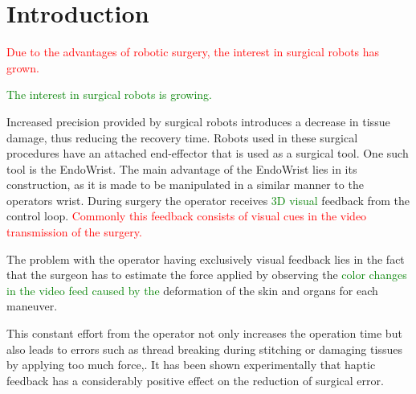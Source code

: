 \section{Introduction}\label{sec:introduction}
{}
\textcolor{red}{Due to the advantages of robotic surgery, the interest in surgical robots has grown\cite{forbes}.}

\textcolor{green}{
The interest in surgical robots is growing\cite{forbes}.
	}

Increased precision provided by surgical robots introduces a decrease in tissue damage, thus reducing the recovery time\cite{RIGSP}.
Robots used in these surgical procedures have an attached end-effector that is used as a surgical tool.
One such tool is the EndoWrist.
The main advantage of the EndoWrist lies in its construction, as it is made to be manipulated in a similar manner to the operators wrist.
During surgery the operator receives \textcolor{green}{3D visual} feedback from the control loop. \textcolor{red}{Commonly this feedback consists of visual cues in the video transmission of the surgery.}


The problem with the operator having exclusively visual feedback lies in the fact that the surgeon has to estimate the force applied by observing the \textcolor{green}{color changes in the video feed caused by the } deformation  of the skin and organs for each maneuver.



This constant effort from the operator not only increases the operation time but also leads to errors such as thread breaking during stitching or damaging tissues by applying too much force,\cite{lee2015grip}. It has been shown experimentally that haptic feedback has a considerably positive effect on the reduction of surgical error\cite{EOFGFF}.


